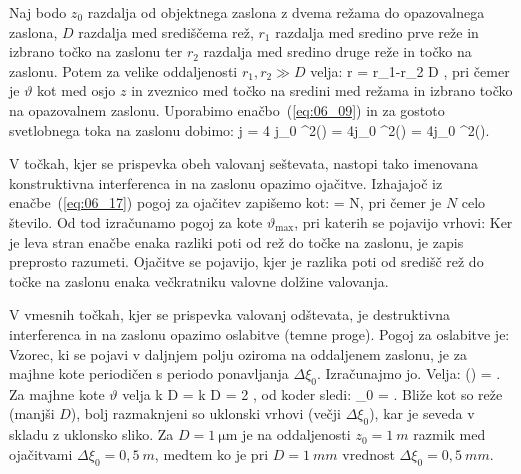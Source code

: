 Naj bodo $z_0$ razdalja od objektnega zaslona z dvema režama 
do opazovalnega zaslona, $D$ razdalja med središčema rež, 
$r_1$ razdalja med sredino prve reže in izbrano točko na zaslonu
ter $r_2$ razdalja med sredino druge reže in točko na zaslonu. Potem za velike 
oddaljenosti $r_1, r_2 \gg D$ velja:
\beq
\Delta r = r_1-r_2 \approx D \sin\vartheta,
\label{eq:06_16}
\eeq
pri čemer je $\vartheta$ kot med osjo $z$ in zveznico med točko na sredini med režama in
izbrano točko na opazovalnem zaslonu. Uporabimo enačbo~(\ref{eq:06_09}) in za gostoto 
svetlobnega toka na zaslonu dobimo:
\beq
j = 4 j_0 \cos^2\left(\right) = 4j_0 \cos^2\left(\right) = 
4j_0 \cos^2\left(\right)\!\!.
\label{eq:06_17}
\eeq

V točkah, kjer se prispevka obeh valovanj seštevata, nastopi tako imenovana
konstruktivna interferenca in na zaslonu opazimo ojačitve. Izhajajoč iz enačbe~(\ref{eq:06_17})
pogoj za ojačitev zapišemo kot:
\beq
{} = N\pi,
\label{eq:06_18}
\eeq
pri čemer je $N$ celo število. Od tod izračunamo pogoj za kote $\vartheta_\mathrm{max}$, pri katerih
se pojavijo vrhovi:
Ker je leva stran enačbe enaka razliki poti od rež do točke na zaslonu, je zapis preprosto razumeti. 
Ojačitve se pojavijo, kjer je razlika poti od središč rež do točke na zaslonu enaka večkratniku 
valovne dolžine valovanja.

V vmesnih točkah, kjer se prispevka valovanj odštevata, je destruktivna
interferenca in na zaslonu opazimo oslabitve (temne proge). Pogoj za oslabitve je:
Vzorec, ki se pojavi v daljnjem polju oziroma na oddaljenem zaslonu,
je za majhne kote periodičen s periodo ponavljanja $\Delta \xi_0$. Izračunajmo jo. Velja:
\beq
\Delta \left(\right) = \pi.
\label{eq:06_19}
\eeq
Za majhne kote $\vartheta$ velja 
\beq
k D \Delta \vartheta = k D  = 2 \pi,
\label{eq:06_20}
\eeq
od koder sledi:
\beq
\Delta \xi_0 = .
\label{eq:06_21}
\eeq
Bliže kot so reže (manjši $D$), bolj razmaknjeni so uklonski vrhovi (večji $\Delta \xi_0$),
kar je seveda v skladu z uklonsko sliko. Za $D=1~\si{\micro\metre}$ je na oddaljenosti 
$z_0 = 1~\si{m}$ razmik med ojačitvami
$\Delta \xi_0 = 0,5~\si{m}$, medtem ko je pri $D = 1~\si{mm}$ 
vrednost $\Delta \xi_0 = 0,5~\si{mm}$. 

